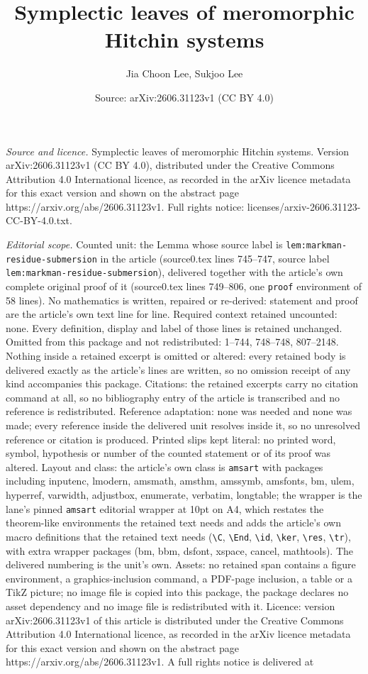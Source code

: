 \documentclass[10pt,a4paper]{amsart}
\title[Symplectic leaves of meromorphic Hitchin systems]{Symplectic leaves of meromorphic Hitchin systems}
\author{Jia Choon Lee, Sukjoo Lee}
\date{Source: arXiv:2606.31123v1 (CC BY 4.0)}
\begin{document}
\maketitle

\noindent\emph{Source and licence.} Symplectic leaves of meromorphic Hitchin systems. Version arXiv:2606.31123v1 (CC BY 4.0), distributed under the Creative Commons Attribution 4.0 International licence, as recorded in the arXiv licence metadata for this exact version and shown on the abstract page https://arxiv.org/abs/2606.31123v1. Full rights notice: licenses/arxiv-2606.31123-CC-BY-4.0.txt.\par\smallskip

\noindent\textit{Editorial scope.} Counted unit: the Lemma whose source label is \texttt{lem:markman-residue-submersion} in the article (source0.tex lines 745--747, source label \texttt{lem:markman-residue-submersion}), delivered together with the article's own complete original proof of it (source0.tex lines 749--806, one \texttt{proof} environment of 58 lines). No mathematics is written, repaired or re-derived: statement and proof are the article's own text line for line. Required context retained uncounted: none. Every definition, display and label of those lines is retained unchanged. Omitted from this package and not redistributed: 1--744, 748--748, 807--2148. Nothing inside a retained excerpt is omitted or altered: every retained body is delivered exactly as the article's lines are written, so no omission receipt of any kind accompanies this package. Citations: the retained excerpts carry no citation command at all, so no bibliography entry of the article is transcribed and no reference is redistributed. Reference adaptation: none was needed and none was made; every reference inside the delivered unit resolves inside it, so no unresolved reference or citation is produced. Printed slips kept literal: no printed word, symbol, hypothesis or number of the counted statement or of its proof was altered. Layout and class: the article's own class is \texttt{amsart} with packages including inputenc, lmodern, amsmath, amsthm, amssymb, amsfonts, bm, ulem, hyperref, varwidth, adjustbox, enumerate, verbatim, longtable; the wrapper is the lane's pinned \texttt{amsart} editorial wrapper at 10pt on A4, which restates the theorem-like environments the retained text needs and adds the article's own macro definitions that the retained text needs (\texttt{\textbackslash C}, \texttt{\textbackslash End}, \texttt{\textbackslash id}, \texttt{\textbackslash ker}, \texttt{\textbackslash res}, \texttt{\textbackslash tr}), with extra wrapper packages (bm, bbm, dsfont, xspace, cancel, mathtools). The delivered numbering is the unit's own. Assets: no retained span contains a figure environment, a graphics-inclusion command, a PDF-page inclusion, a table or a TikZ picture; no image file is copied into this package, the package declares no asset dependency and no image file is redistributed with it. Licence: version arXiv:2606.31123v1 of this article is distributed under the Creative Commons Attribution 4.0 International licence, as recorded in the arXiv licence metadata for this exact version and shown on the abstract page https://arxiv.org/abs/2606.31123v1. A full rights notice is delivered at 
\end{document}
